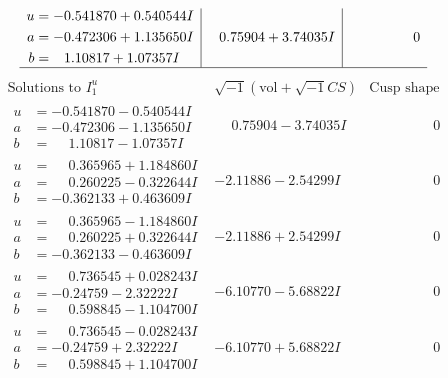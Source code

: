 \documentclass[1p]{elsarticle_modified}
\theoremstyle{definition}
\newcommand{\I}{\sqrt{-1}}
\begin{document}
$$\begin{array}{c|c|c}
\begin{aligned}
u &= -0.541870 + 0.540544 I \\
a &= -0.472306 + 1.135650 I \\
b &= \phantom{-}1.10817 + 1.07357 I\end{aligned}
 & \phantom{-}0.75904 + 3.74035 I & \phantom{-0.000000 } 0\\
 \hline 
 \end{array}$$\newpage$$\begin{array}{c|c|c}  
\text{Solutions to }I^u_{1}& \I (\text{vol} + \sqrt{-1}CS) & \text{Cusp shape}\\
 \hline 
\begin{aligned}
u &= -0.541870 - 0.540544 I \\
a &= -0.472306 - 1.135650 I \\
b &= \phantom{-}1.10817 - 1.07357 I\end{aligned}
 & \phantom{-}0.75904 - 3.74035 I & \phantom{-0.000000 } 0 \\ \hline\begin{aligned}
u &= \phantom{-}0.365965 + 1.184860 I \\
a &= \phantom{-}0.260225 - 0.322644 I \\
b &= -0.362133 + 0.463609 I\end{aligned}
 & -2.11886 - 2.54299 I & \phantom{-0.000000 } 0 \\ \hline\begin{aligned}
u &= \phantom{-}0.365965 - 1.184860 I \\
a &= \phantom{-}0.260225 + 0.322644 I \\
b &= -0.362133 - 0.463609 I\end{aligned}
 & -2.11886 + 2.54299 I & \phantom{-0.000000 } 0 \\ \hline\begin{aligned}
u &= \phantom{-}0.736545 + 0.028243 I \\
a &= -0.24759 - 2.32222 I \\
b &= \phantom{-}0.598845 - 1.104700 I\end{aligned}
 & -6.10770 - 5.68822 I & \phantom{-0.000000 } 0 \\ \hline\begin{aligned}
u &= \phantom{-}0.736545 - 0.028243 I \\
a &= -0.24759 + 2.32222 I \\
b &= \phantom{-}0.598845 + 1.104700 I\end{aligned}
 & -6.10770 + 5.68822 I & \phantom{-0.000000 } 0 \\ \hline\begin{aligned}

\end{aligned}
\end{array}$$
\end{document}
